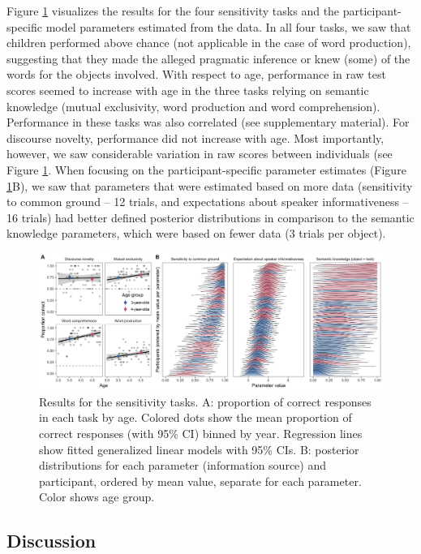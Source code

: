 \documentclass[
  man,mask,floatsintext]{apa6}
\begin{document}
Figure \ref{fig:fig2} visualizes the results for the four sensitivity tasks and the participant-specific model parameters estimated from the data. In all four tasks, we saw that children performed above chance (not applicable in the case of word production), suggesting that they made the alleged pragmatic inference or knew (some) of the words for the objects involved. With respect to age, performance in raw test scores seemed to increase with age in the three tasks relying on semantic knowledge (mutual exclusivity, word production and word comprehension). Performance in these tasks was also correlated (see supplementary material). For discourse novelty, performance did not increase with age. Most importantly, however, we saw considerable variation in raw scores between individuals (see Figure \ref{fig:fig2}. When focusing on the participant-specific parameter estimates (Figure \ref{fig:fig2}B), we saw that parameters that were estimated based on more data (sensitivity to common ground -- 12 trials, and expectations about speaker informativeness -- 16 trials) had better defined posterior distributions in comparison to the semantic knowledge parameters, which were based on fewer data (3 trials per object).

\begin{figure}
\includegraphics[width=1\linewidth]{./figures/fig2_1} \caption{Results for the sensitivity tasks. A: proportion of correct responses in each task by age. Colored dots show the mean proportion of correct responses (with 95\% CI) binned by year. Regression lines show fitted generalized linear models with 95\% CIs. B: posterior distributions for each parameter (information source) and participant, ordered by mean value, separate for each parameter. Color shows age group.}\label{fig:fig2}
\end{figure}

\hypertarget{discussion}{%
\subsection{Discussion}\label{discussion}}
\end{document}
